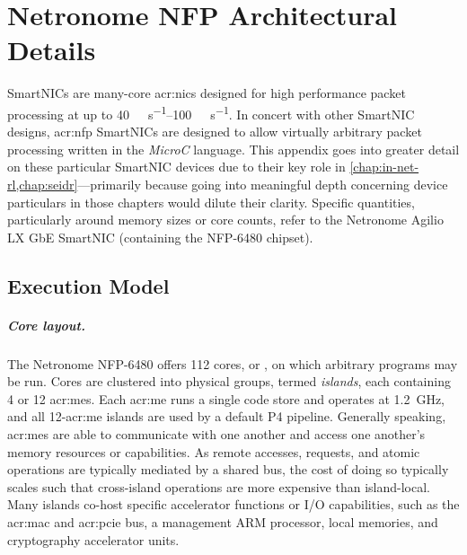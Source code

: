 \chapter{Netronome NFP Architectural Details}
\label{adx:nfp-arch}

 SmartNICs are many-core  \glspl{acr:nic} designed for high performance packet processing at up to \qtyrange{40}{100}{\giga\bit\per\second}.
In concert with other SmartNIC designs, \gls{acr:nfp} SmartNICs are designed to allow virtually arbitrary packet processing written in the \emph{MicroC} language.
This appendix goes into greater detail on these particular SmartNIC devices due to their key role in \cref{chap:in-net-rl,chap:seidr}---primarily because going into meaningful depth concerning device particulars in those chapters would dilute their clarity.
Specific quantities, particularly around memory sizes or core counts, refer to the Netronome Agilio LX GbE SmartNIC (containing the NFP-6480 chipset).

\section{Execution Model}
\paragraph{Core layout.}
The Netronome NFP-6480 offers \num{112} cores, or , on which arbitrary programs may be run.
Cores are clustered into physical groups, termed \emph{islands}, each containing 4 or 12 \glspl{acr:me}.
Each \gls{acr:me} runs a single code store and operates at \qty{1.2}{\giga\hertz}, and all 12-\gls{acr:me} islands are used by a default P4 pipeline.
Generally speaking, \glspl{acr:me} are able to communicate with one another and access one another's memory resources or capabilities.
As remote accesses, requests, and atomic operations are typically mediated by a shared  bus, the cost of doing so typically scales such that cross-island operations are more expensive than island-local.
Many islands co-host specific accelerator functions or I/O capabilities, such as the \gls{acr:mac} and \gls{acr:pcie} bus, a management ARM processor, local memories, and cryptography accelerator units.

